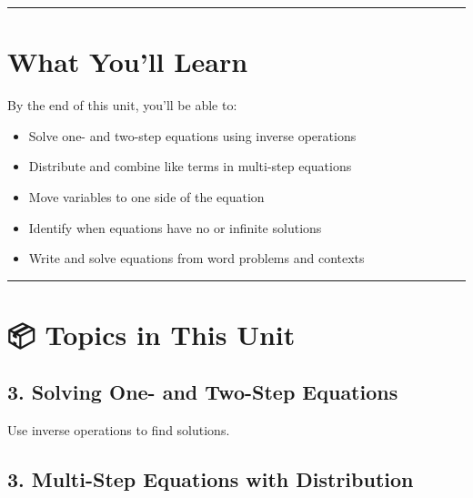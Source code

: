 \documentclass[
  letterpaper,
]{scrrept}
\providecommand{\tightlist}{%
  \setlength{\itemsep}{0pt}\setlength{\parskip}{0pt}}
\begin{document}
\begin{center}\rule{0.5\linewidth}{0.5pt}\end{center}

\section*{What You'll Learn}\label{what-youll-learn-1}


By the end of this unit, you'll be able to:

\begin{itemize}
\tightlist
\item
  Solve one- and two-step equations using inverse operations
\item
  Distribute and combine like terms in multi-step equations
\item
  Move variables to one side of the equation
\item
  Identify when equations have no or infinite solutions
\item
  Write and solve equations from word problems and contexts
\end{itemize}

\begin{center}\rule{0.5\linewidth}{0.5pt}\end{center}

\section*{📦 Topics in This Unit}\label{topics-in-this-unit-1}


\subsection*{3. Solving One- and Two-Step
Equations}\label{solving-one--and-two-step-equations}

Use inverse operations to find solutions.

\subsection*{3. Multi-Step Equations with
Distribution}\label{multi-step-equations-with-distribution}
\end{document}
